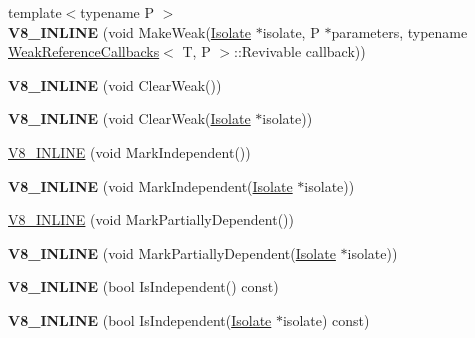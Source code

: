 \begin{DoxyCompactItemize}
\item 
\hypertarget{classv8_1_1_persistent_a3109f3db13fe2a4bfca230168ef8c6b8}{}{\footnotesize template$<$typename P $>$ }\\{\bfseries V8\+\_\+\+I\+N\+L\+I\+N\+E} (void Make\+Weak(\hyperlink{classv8_1_1_isolate}{Isolate} $\ast$isolate, P $\ast$parameters, typename \hyperlink{classv8_1_1_weak_reference_callbacks}{Weak\+Reference\+Callbacks}$<$ T, P $>$\+::Revivable callback))\label{classv8_1_1_persistent_a3109f3db13fe2a4bfca230168ef8c6b8}

\item 
\hypertarget{classv8_1_1_persistent_aef009f9e3c6e0ac21cdbad2907686ac3}{}{\bfseries V8\+\_\+\+I\+N\+L\+I\+N\+E} (void Clear\+Weak())\label{classv8_1_1_persistent_aef009f9e3c6e0ac21cdbad2907686ac3}

\item 
\hypertarget{classv8_1_1_persistent_a500449e9aaa394cd9df95c698a487ac9}{}{\bfseries V8\+\_\+\+I\+N\+L\+I\+N\+E} (void Clear\+Weak(\hyperlink{classv8_1_1_isolate}{Isolate} $\ast$isolate))\label{classv8_1_1_persistent_a500449e9aaa394cd9df95c698a487ac9}

\item 
\hyperlink{classv8_1_1_persistent_aa8497281225e9678f03b6997ae559960}{V8\+\_\+\+I\+N\+L\+I\+N\+E} (void Mark\+Independent())
\item 
\hypertarget{classv8_1_1_persistent_a2b4071c032c97886ba1bcb0ebacb2209}{}{\bfseries V8\+\_\+\+I\+N\+L\+I\+N\+E} (void Mark\+Independent(\hyperlink{classv8_1_1_isolate}{Isolate} $\ast$isolate))\label{classv8_1_1_persistent_a2b4071c032c97886ba1bcb0ebacb2209}

\item 
\hyperlink{classv8_1_1_persistent_ab096f22fc5023ba07631537633b42565}{V8\+\_\+\+I\+N\+L\+I\+N\+E} (void Mark\+Partially\+Dependent())
\item 
\hypertarget{classv8_1_1_persistent_a89a708d5a98331a2683324be9dc5a474}{}{\bfseries V8\+\_\+\+I\+N\+L\+I\+N\+E} (void Mark\+Partially\+Dependent(\hyperlink{classv8_1_1_isolate}{Isolate} $\ast$isolate))\label{classv8_1_1_persistent_a89a708d5a98331a2683324be9dc5a474}

\item 
\hypertarget{classv8_1_1_persistent_ae63945077238e19dbe1566c316c1c774}{}{\bfseries V8\+\_\+\+I\+N\+L\+I\+N\+E} (bool Is\+Independent() const)\label{classv8_1_1_persistent_ae63945077238e19dbe1566c316c1c774}

\item 
\hypertarget{classv8_1_1_persistent_a0cb1529e8138c0072f6efac79056e225}{}{\bfseries V8\+\_\+\+I\+N\+L\+I\+N\+E} (bool Is\+Independent(\hyperlink{classv8_1_1_isolate}{Isolate} $\ast$isolate) const)\label{classv8_1_1_persistent_a0cb1529e8138c0072f6efac79056e225}


\end{DoxyCompactItemize}
